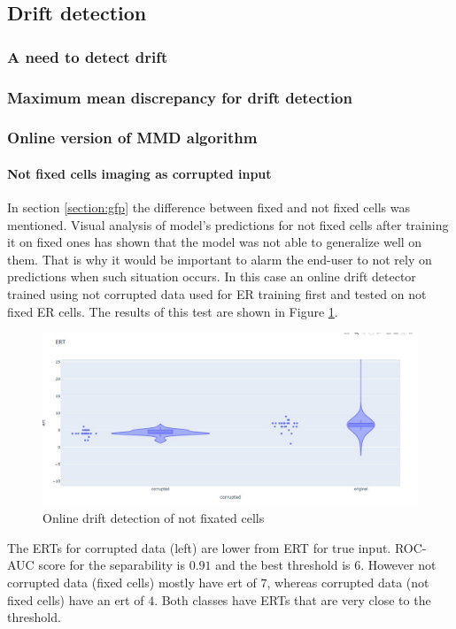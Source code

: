 \subsection{Drift detection}
    \subsubsection{A need to detect drift}
    \subsubsection{Maximum mean discrepancy for drift detection}
        
    \subsubsection{Online version of MMD algorithm}
            
            \paragraph{Not fixed cells imaging as corrupted input}
                In section \ref{section:gfp} the difference between fixed and not fixed cells was mentioned. Visual analysis of model's predictions for not fixed cells after training it on fixed ones has shown that the model was not able to generalize well on them. That is why it would be important to alarm the end-user to not rely on predictions when such situation occurs. In this case an online drift detector trained using not corrupted data used for ER training first and tested on not fixed ER cells. The results of this test are shown in Figure \ref{fig:online-drift-not-fixed}.
                \begin{figure}[H]
                    \begin{center}
                        \includegraphics[width=0.5\linewidth]{bilder/drift-detection/online-fixed-vs-not-fixed.jpg}
                        \caption{Online drift detection of not fixated cells}\label{fig:online-drift-not-fixed}
                    \end{center}
                \end{figure}
                The ERTs for corrupted data (left) are lower from ERT for true input. ROC-AUC score for the separability is $0.91$ and the best threshold is $6$. However not corrupted data (fixed cells) mostly have ert of $7$, whereas corrupted data (not fixed cells) have an ert of $4$. Both classes have ERTs that are very close to the threshold.